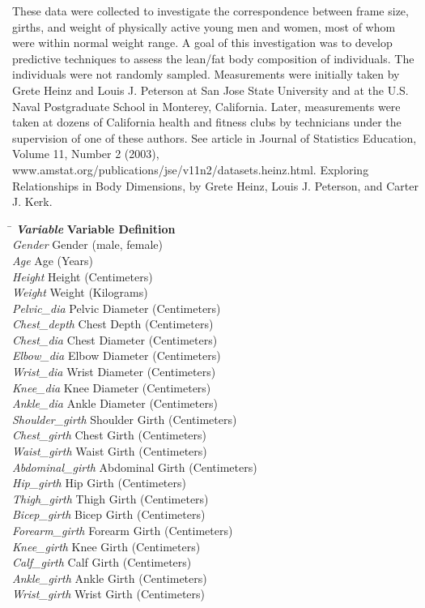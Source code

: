 These data were collected to investigate the correspondence between
frame size, girths, and weight of physically active young men and
women, most of whom were within normal weight range. A goal of this
investigation was to develop predictive techniques to assess the lean/fat
body composition of individuals. The individuals were not randomly
sampled. Measurements were initially taken by Grete Heinz and Louis
J. Peterson at San Jose State University and at the U.S. Naval Postgraduate
School in Monterey, California. Later, measurements were taken at
dozens of California health and fitness clubs by technicians under
the supervision of one of these authors. See article in Journal of
Statistics Education, Volume 11, Number 2 (2003), www.amstat.org/publications/jse/v11n2/datasets.heinz.html.
Exploring Relationships in Body Dimensions, by Grete Heinz, Louis
J. Peterson, and Carter J. Kerk.

\begin{tabbing}
\hspace*{1.2in}\=\kill
\textbf{\emph{Variable}}\> \textbf{Variable Definition}\\
\emph{Gender}\>  Gender (male, female)\\
\emph{Age}\>  Age (Years)\\
\emph{Height}\>  Height (Centimeters)\\
\emph{Weight}\>  Weight (Kilograms)\\
\emph{Pelvic\_dia}\>  Pelvic Diameter (Centimeters)\\
\emph{Chest\_depth}\>  Chest Depth (Centimeters) \\
\emph{Chest\_dia}\>  Chest Diameter (Centimeters)\\
\emph{Elbow\_dia}\>  Elbow Diameter (Centimeters)\\
\emph{Wrist\_dia}\>  Wrist Diameter (Centimeters)\\
\emph{Knee\_dia}\>  Knee Diameter (Centimeters) \\
\emph{Ankle\_dia}\>  Ankle Diameter (Centimeters)\\
\emph{Shoulder\_girth}\>  Shoulder Girth (Centimeters)\\
\emph{Chest\_girth }\> Chest Girth (Centimeters)\\
\emph{Waist\_girth}\>  Waist Girth (Centimeters)\\
\emph{Abdominal\_girth}\>  Abdominal Girth (Centimeters)\\
\emph{Hip\_girth}\>  Hip Girth (Centimeters)\\
\emph{Thigh\_girth}\>  Thigh Girth (Centimeters)\\
\emph{Bicep\_girth}\>  Bicep Girth (Centimeters)\\
\emph{Forearm\_girth}\>  Forearm Girth (Centimeters)\\
\emph{Knee\_girth}\>  Knee Girth (Centimeters)\\
\emph{Calf\_girth}\>  Calf Girth (Centimeters)\\
\emph{Ankle\_girth}\>  Ankle Girth (Centimeters)\\
\emph{Wrist\_girth}\>  Wrist Girth (Centimeters)
\end{tabbing}
